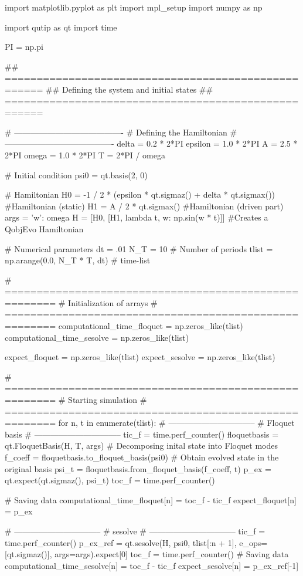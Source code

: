 import matplotlib.pyplot as plt
import mpl_setup
import numpy as np

import qutip as qt
import time

PI = np.pi


## ====================================================
## Defining the system and initial states
## ====================================================

# ----------------------------------------
# Defining the Hamiltonian
# ----------------------------------------
delta = 0.2 * 2*PI
epsilon = 1.0 * 2*PI
A = 2.5 * 2*PI
omega = 1.0 * 2*PI
T = 2*PI / omega

# Initial condition
psi0 = qt.basis(2, 0)

# Hamiltonian
H0 = -1 / 2 * (epsilon * qt.sigmaz() + delta * qt.sigmax()) #Hamiltonian (static)
H1 = A / 2 * qt.sigmax() #Hamiltonian (driven part)
args = {'w': omega}
H = [H0, [H1, lambda t, w: np.sin(w * t)]] #Creates a QobjEvo Hamiltonian

# Numerical parameters
dt = .01
N_T = 10  # Number of periods
tlist = np.arange(0.0, N_T * T, dt)  # time-list


# ======================================================
# Initialization of arrays
# ======================================================
computational_time_floquet = np.zeros_like(tlist)
computational_time_sesolve = np.zeros_like(tlist)

expect_floquet = np.zeros_like(tlist)
expect_sesolve = np.zeros_like(tlist)


# ======================================================
# Starting simulation
# ======================================================
for n, t in enumerate(tlist):
    # --------------------------------
    # Floquet basis
    # --------------------------------
    tic_f = time.perf_counter()
    floquetbasis = qt.FloquetBasis(H, T, args)
    # Decomposing inital state into Floquet modes
    f_coeff = floquetbasis.to_floquet_basis(psi0)
    # Obtain evolved state in the original basis
    psi_t = floquetbasis.from_floquet_basis(f_coeff, t)
    p_ex = qt.expect(qt.sigmaz(), psi_t)
    toc_f = time.perf_counter()

    # Saving data
    computational_time_floquet[n] = toc_f - tic_f
    expect_floquet[n] = p_ex

    # --------------------------------
    # sesolve
    # --------------------------------
    tic_f = time.perf_counter()
    p_ex_ref = qt.sesolve(H, psi0, tlist[:n + 1], e_ops=[qt.sigmaz()], args=args).expect[0]
    toc_f = time.perf_counter()
    # Saving data
    computational_time_sesolve[n] = toc_f - tic_f
    expect_sesolve[n] = p_ex_ref[-1]


